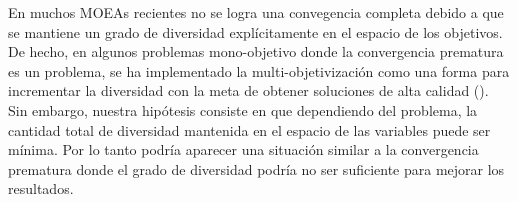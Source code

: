 En muchos MOEAs recientes no se logra una convegencia completa debido a que se mantiene un grado de diversidad explícitamente en el espacio de los objetivos.
%
De hecho, en algunos problemas mono-objetivo donde la convergencia prematura es un problema, se ha implementado la multi-objetivización como una forma para incrementar la diversidad con la meta de obtener soluciones de alta calidad (\cite{Joel:MOEAS_CONSTRAINED}).
%
Sin embargo, nuestra hipótesis consiste en que dependiendo del problema, la cantidad total de diversidad mantenida en el espacio de las variables puede ser mínima.
%
Por lo tanto podría aparecer una situación similar a la convergencia prematura donde el grado de diversidad podría no ser suficiente para mejorar los resultados.

